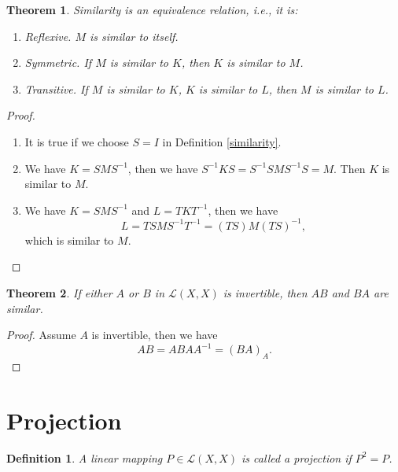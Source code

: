 \documentclass[11pt]{book}
\newtheorem{definition}{Definition}[chapter]
\newtheorem{theorem}{Theorem}[chapter]
\theoremstyle{definition}
\numberwithin{equation}{chapter}
\begin{document}
\begin{theorem}
Similarity is an equivalence relation, i.e., it is:
\begin{enumerate}[label=(\alph*)]
    \item Reflexive. $M$ is similar to itself.
    \item Symmetric. If $M$ is similar to $K$, then $K$ is similar to $M$.
    \item Transitive. If $M$ is similar to $K$, $K$ is similar to $L$, then $M$ is similar to $L$.
\end{enumerate}
\end{theorem}
\begin{proof}
~\begin{enumerate}[label=(\alph*)]
    \item It is true if we choose $S=I$ in Definition \ref{similarity}.
    \item We have $K = SMS^{-1}$, then we have $S^{-1}KS = S^{-1} S M S^{-1} S = M$. Then $K$ is similar to $M$.
    \item We have $K = SMS^{-1}$ and $L=TKT^{-1}$, then we have $$L = TSMS^{-1}T^{-1} = (TS)M(TS)^{-1},$$ which is similar to $M$.
\end{enumerate}
\end{proof}

\medskip

\begin{theorem}
If either $A$ or $B$ in $\mathscr{L}(X,X)$ is invertible, then $AB$ and $BA$ are similar.
\end{theorem}
\begin{proof}
Assume $A$ is invertible, then we have 
$$AB = ABAA^{-1} = (BA)_A.$$
\end{proof}

\medskip

\section{Projection}
\begin{definition}
A linear mapping $P\in \mathscr{L}(X,X)$ is called a projection if $P^2=P$.
\end{definition}

\medskip
\end{document}
